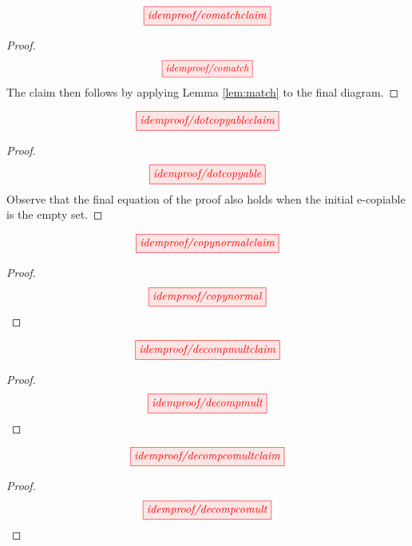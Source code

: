 \begin{myboxR}
\begin{lemma}[Co-match]\label{lem:comatch}
\[\scalebox{1}{\tikzfig{idemproof/comatchclaim}}\]
\begin{proof}
\[\scalebox{0.9}{\tikzfig{idemproof/comatch}}\]
The claim then follows by applying Lemma \ref{lem:match} to the final diagram.
\end{proof}
\end{lemma}
\end{myboxR}

\begin{myboxB}
\begin{lemma}\label{lem:ecopyfixpoint}
\[\scalebox{1}{\tikzfig{idemproof/dotcopyableclaim}}\]
\begin{proof}
\[\scalebox{1}{\tikzfig{idemproof/dotcopyable}}\]
Observe that the final equation of the proof also holds when the initial e-copiable is the empty set.
\end{proof}
\end{lemma}
\end{myboxB}

\begin{myboxR}
\begin{lemma}\label{lem:ecopynormal}
\[\scalebox{1}{\tikzfig{idemproof/copynormalclaim}}\]
\begin{proof}
\[\scalebox{1}{\tikzfig{idemproof/copynormal}}\]
\end{proof}
\end{lemma}
\end{myboxR}

\begin{myboxB}
\begin{proposition}\label{prop:decompmult}
\[\scalebox{1}{\tikzfig{idemproof/decompmultclaim}}\]
\begin{proof}
\[\scalebox{1}{\tikzfig{idemproof/decompmult}}\]
\end{proof}
\end{proposition}
\end{myboxB}

\begin{myboxR}
\begin{proposition}\label{prop:decompcomult}
\[\scalebox{1}{\tikzfig{idemproof/decompcomultclaim}}\]
\begin{proof}
\[\scalebox{1}{\tikzfig{idemproof/decompcomult}}\]
\end{proof}
\end{proposition}
\end{myboxR}

